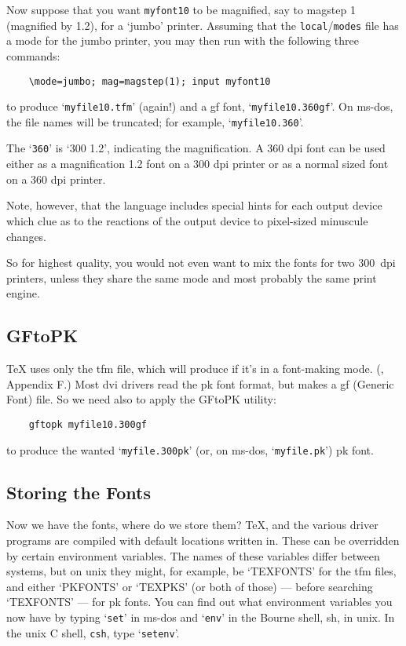 Now suppose that you want {\tt myfont10} to be magnified,
say to magstep 1 (magnified by 1.2), for a `jumbo' printer.
Assuming that the {\tt local}/{\tt modes} file has a mode
for the jumbo printer,
you may then run \MF{} with the following three commands:
\begin{verbatim}
    \mode=jumbo; mag=magstep(1); input myfont10
\end{verbatim}
to produce `{\tt myfile10.tfm}' (again!)
and a {\sc gf} font, `{\tt myfile10.360gf}'.
On {\sc ms-dos}, the file names will be truncated;
for example, `{\tt myfile10.360}'.

The `{\tt 360}' is `300 {\tt *} 1.2', indicating the magnification.
A 360 dpi font can be used either as a magnification 1.2 font on
a 300 dpi printer or as a normal sized font on a 360 dpi printer.

Note, however, that the \MF{} language includes special hints for
each output device which clue \MF{} as to the reactions of the
output device to pixel-sized minuscule changes.

So for highest quality, you would not even want to mix the fonts for
two 300~dpi printers, unless they share the same mode and most probably
the same print engine.


\subsection{{\sf GFtoPK}}\label{sub:gftopk}

\TeX{} uses only the {\sc tfm} file, which \MF{}
will produce if it's in a font-making mode.
(\MFbook{}, Appendix F.)
Most {\sc dvi} drivers read the {\sc pk} font format,
but \MF{} makes a {\sc gf} (Generic Font) file.
So we need also to apply the {\sf GFtoPK} utility:
\begin{verbatim}
    gftopk myfile10.300gf
\end{verbatim}
to produce the wanted `{\tt myfile.300pk}'
(or, on {\sc ms-dos}, `{\tt myfile.pk}')
{\sc pk} font.


\subsection{Storing the Fonts}\label{sub:store}

Now we have the fonts, where do we store them?  \TeX{}, \MF{} and
the various driver programs are compiled with default locations
written in.
These can be overridden by certain environment variables.
The names of these variables differ between systems,
but on {\sc unix} they might, for example, be `TEXFONTS' for the
{\sc tfm} files, and either `PKFONTS' or `TEXPKS' (or both of those)
--- before searching `TEXFONTS' --- for {\sc pk} fonts.
You can find out what environment variables you now have
by typing `{\tt set}' in {\sc ms-dos} and `{\tt env}' in the Bourne shell, sh,
in {\sc unix}.  In the {\sc unix} C shell, {\tt csh}, type
`{\tt setenv}'.

